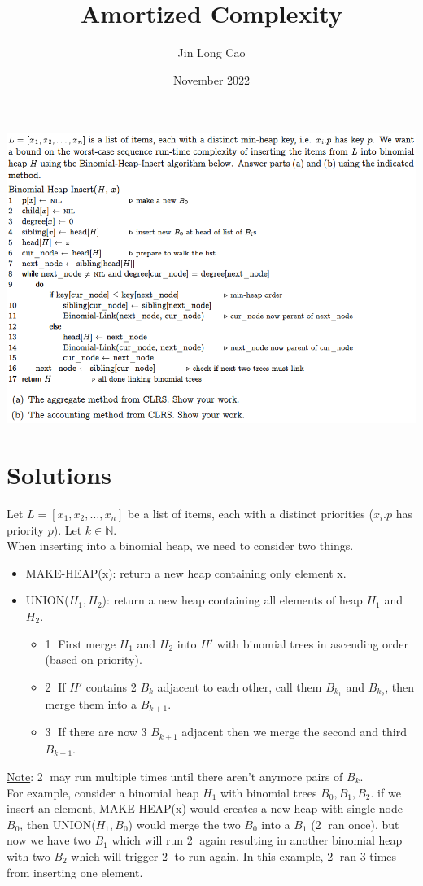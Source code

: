 \documentclass{article}
\title{Amortized Complexity}
\author{Jin Long Cao}
\date{November 2022}
\begin{document}
\maketitle
\includegraphics[width=\textwidth]{Amortized Complexity}
\newpage
\section*{Solutions}
Let $L = [x_1, x_2, \dots, x_n]$ be a list of items, each with a distinct priorities ($x_i.p$ has priority $p$). Let $k \in \mathbb{N}$.\\
When inserting into a binomial heap, we need to consider two things. 
\begin{itemize}
    \item MAKE-HEAP(x): return a new heap containing only element x.
    \item UNION($H_1, H_2$): return a new heap containing all elements of heap $H_1$ and $H_2$.
    \begin{itemize}
        \item \textcircled{1} First merge $H_1$ and $H_2$ into $H'$ with binomial trees in ascending order (based on priority).
        \item \textcircled{2} If $H'$ contains 2 $B_k$ adjacent to each other, call them $B_{k_1}$ and $B_{k_2}$, then merge them into a $B_{k+1}$.
        \item \textcircled{3} If there are now 3 $B_{k+1}$ adjacent then we merge the second and third $B_{k+1}$.
    \end{itemize}
\end{itemize}
\underline{Note}: \textcircled{2} may run multiple times until there aren't anymore pairs of $B_k$. \\
For example, consider a binomial heap $H_1$ with binomial trees $B_0, B_1, B_2$. if we insert an element, MAKE-HEAP(x) would creates a new heap with single node $B_0$, then UNION($H_1, B_0$) would merge the two $B_0$ into a $B_1$ (\textcircled{2} ran once), but now we have two $B_1$ which will run \textcircled{2} again resulting in another binomial heap with two $B_2$ which will trigger \textcircled{2} to run again. In this example, \textcircled{2} ran 3 times from inserting one element.
\end{document}
